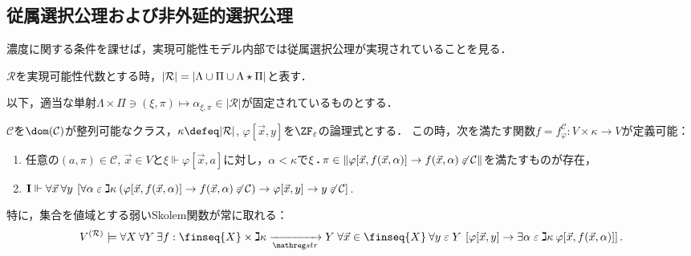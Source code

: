 \documentclass[realisability.tex]{subfiles}
\begin{document}
\subsection{従属選択公理および非外延的選択公理}
濃度に関する条件を課せば，実現可能性モデル内部では従属選択公理が実現されていることを見る．
\begin{definition}
 $\mathcal{R}$を実現可能性代数とする時，$|\mathcal{R}| = \left\lvert\Lambda \cup \Pi \cup \Lambda \mathbin{\star} \Pi\right\rvert$と表す．

 以下，適当な単射$\Lambda \times \Pi \ni (\xi, \pi) \mapsto \alpha_{\xi,\pi} \in |\mathcal{R}|$が固定されているものとする．
\end{definition}

\begin{lemma}\label{lem:weak-skolem-gen}
 $\mathcal{C}$を$\dom(\mathcal{C})$が整列可能なクラス，$\kappa \defeq |\mathcal{R}|$, $\varphi[\vec{x}, y]$を$\ZF_{\varepsilon}$の論理式とする．
 この時，次を満たす関数$f = f^{\mathcal{C}}_{\varphi}: V \times \kappa \to V$が定義可能：
 \begin{enumerate}
  \item \label{item:sk-hered}任意の$(a, \pi) \in \mathcal{C}$, $\vec{x} \in V$と$\xi \Vdash \varphi[\vec{x}, a]$に対し，$\alpha < \kappa$で$\xi \mathbin{\boldsymbol{.}} \pi \in \|\varphi[\vec{x}, f(\vec{x}, \alpha)] \to f(\vec{x}, \alpha) \not\mathrel{\varepsilon} \mathcal{C}\|$を満たすものが存在，
  \item $\mathsf{\mathbf{I}} \Vdash \forall \vec{x} \: \forall y \:\left[ \forall \alpha \mathrel{\varepsilon} \gimel \kappa\: (\varphi[\vec{x}, f(\vec{x}, \alpha)] \to f(\vec{x},\alpha) \not\mathrel{\varepsilon} \mathcal{C}) \to \varphi[\vec{x}, y] \to y \not\mathrel{\varepsilon} \mathcal{C} \right]$. 
 \end{enumerate}
 特に，集合を値域とする弱いSkolem関数が常に取れる：
 \[
 V^{(\mathcal{R})} \models \forall X\: \forall Y \: \exists f: \finseq{X} \times \gimel \kappa \strto Y\; \forall \vec{x} \in \finseq{X} \:\forall y \strin Y \: 
  \left[\varphi[\vec{x}, y] \to \exists \alpha \strin \gimel \kappa \: \varphi[\vec{x}, f(\vec{x}, \alpha)]\right].
 \]
\end{lemma}
\end{document}
